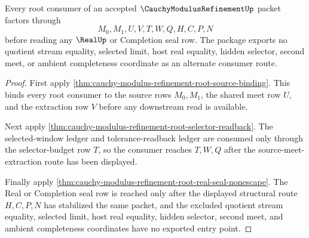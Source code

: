 \begin{theorem}
\label{thm:cauchy-modulus-refinement-root-consumer-package}
Every root consumer of an accepted $\CauchyModulusRefinementUp$ packet factors through
$$
M_0,M_1,U,V,T,W,Q,H,C,P,N
$$
before reading any $\RealUp$ or Completion seal row. The package exports no quotient stream equality, selected limit, host real equality, hidden selector, second meet, or ambient completeness coordinate as an alternate consumer route.
\end{theorem}
\begin{proof}
First apply \autoref{thm:cauchy-modulus-refinement-root-source-binding}. This binds every root consumer to the source rows $M_0,M_1$, the shared meet row $U$, and the extraction row $V$ before any downstream read is available.

Next apply \autoref{thm:cauchy-modulus-refinement-root-selector-readback}. The selected-window ledger and tolerance-readback ledger are consumed only through the selector-budget row $T$, so the consumer reaches $T,W,Q$ after the source-meet-extraction route has been displayed.

Finally apply \autoref{thm:cauchy-modulus-refinement-root-real-seal-nonescape}. The Real or Completion seal row is reached only after the displayed structural route $H,C,P,N$ has stabilized the same packet, and the excluded quotient stream equality, selected limit, host real equality, hidden selector, second meet, and ambient completeness coordinates have no exported entry point.
\end{proof}

